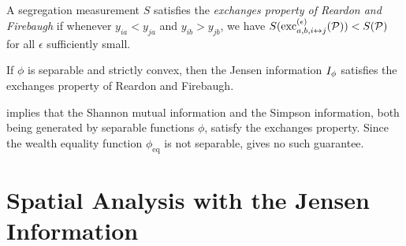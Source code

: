 \begin{dfn}
  A segregation measurement $S$ satisfies the \emph{exchanges property of Reardon and Firebaugh} \cite{reardonMeasuresMultigroupSegregation2002} if whenever $y_{i a} < y_{j a}$ and $y_{i b} > y_{j b}$, we have $S(\mathrm{exc}_{a,b, i\leftrightarrow j}^{(\epsilon)}(\mathcal{P})) < S(\mathcal{P})$ for all $\epsilon$ sufficiently small. 
\end{dfn}

\begin{thm} \label{thm:exchanges}
  If $\phi$ is separable and strictly convex, then the Jensen information $I_{\phi}$ satisfies the exchanges property of Reardon and Firebaugh.
\end{thm}

 implies that the Shannon mutual information and the Simpson information, both being generated by separable functions $\phi$, satisfy the exchanges property. 
Since the wealth equality function $\phi_{\mathrm{eq}}$ is not separable,  gives no such guarantee. 


\section{Spatial Analysis with the Jensen Information} \label{sec:spatial-analysis}

